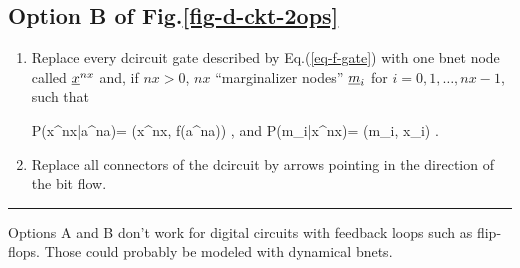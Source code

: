\subsection{Option B of Fig.\ref{fig-d-ckt-2ops}}
\begin{enumerate}
\item
Replace every dcircuit  gate 
described by Eq.(\ref{eq-f-gate})
with
one bnet node called ${\underline{x}}^{nx}$
and, if $nx>0$, 
$nx$ \enquote{marginalizer nodes} ${\underline{m}}_i$
for $i=0, 1, \ldots, nx-1$, such that

\beq\color{blue}
P(x^{nx}|a^{na})=
\delta(x^{nx}, f(a^{na}))
\;,
\eeq
and
\beq\color{blue}
P(m_i|x^{nx})=
\delta(m_i, x_i)
\;.
\eeq


\item
Replace
all connectors of the dcircuit
by arrows 
pointing in the direction
of the bit flow.



\end{enumerate}
\hrule 
Options A and B don't work
for digital circuits 
with feedback loops 
such as flip-flops.
Those could probably
be modeled with 
dynamical bnets.